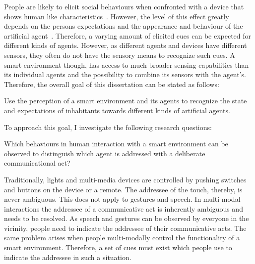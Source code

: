 People are likely to elicit social behaviours when confronted with a \gls{device} that shows human like characteristics~\cite{Reeves1996}.
However, the level of this effect greatly depends on the persons expectations and the appearance and behaviour of the \gls{artificial agent}~\cite{Hegel2008a}.
Therefore, a varying amount of elicited  cues can be expected for different kinds of agents.
However, as different agents and \glspl{device} have different sensors, they often do not have the sensory means to recognize such cues.
A \gls{smart environment} though, has access to much broader sensing capabilities than its individual agents and the possibility to combine its sensors with the agent's.
Therefore, the overall goal of this dissertation can be stated as follows:
\newcommand{\hypmain}{
	Use the perception of a \gls{smart environment} and its agents to recognize the \glsatt{conversation} state and expectations of inhabitants towards different kinds of \glspl{artificial agent}.
	}
\begin{hyp1}
  \label{hyp1}
  \hypmain
\end{hyp1}
To approach this goal, I investigate the following research questions:
\newcommand{\hypaddress}{Which behaviours in \naive{} human interaction with a \gls{smart environment} can be observed  to distinguish which agent is addressed with a deliberate communicational act?}
\begin{hyp2}
	\label{hyp.address}
	\hypaddress
\end{hyp2}
Traditionally, lights and multi-media \glspl{device} are controlled by pushing switches and buttons on the \gls{device} or a remote.
The \gls{addressee} of the touch, thereby, is never ambiguous.
This does not apply to gestures and speech.
In multi-modal interactions the \gls{addressee} of a communicative act is inherently ambiguous and needs to be resolved.
As speech and gestures can be observed by everyone in the vicinity, people need to indicate the \gls{addressee} of their communicative acts.
The same problem arises when people multi-modally control the functionality of a \gls{smart environment}.
Therefore, a set of cues must exist which people use to indicate the \gls{addressee} in such a situation.
\newcommand{\hypmeka}{How can an \gls{artificial agent} visually recognize whether it was addressed by a person within its \gls{conversational group} or not?}
